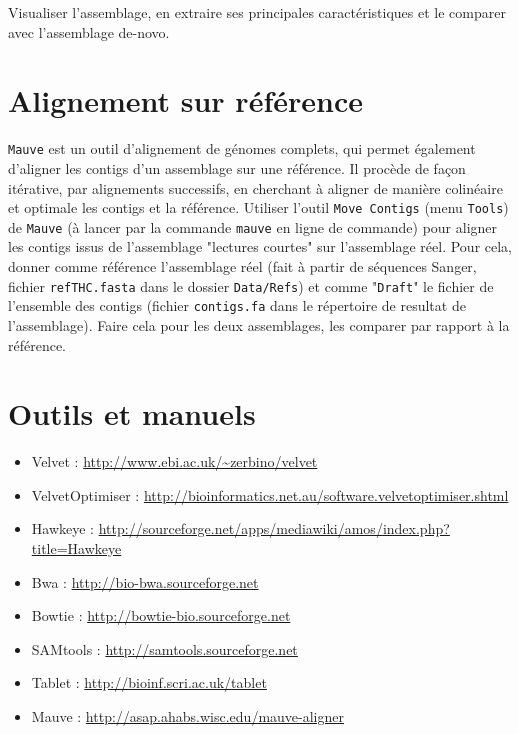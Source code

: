 \documentclass[a4paper,12pt]{article}
\begin{document}
Visualiser l'assemblage, en extraire ses principales caractéristiques  et le comparer avec l'assemblage de-novo.

\section{Alignement sur référence}
\verb=Mauve= est un outil d'alignement de génomes complets, qui permet également d'aligner les contigs d'un assemblage sur une référence. Il procède de façon itérative, par alignements successifs, en cherchant à aligner de manière colinéaire et optimale les contigs et la référence.
Utiliser l'outil \verb=Move Contigs= (menu \verb=Tools=) de \verb=Mauve= (à lancer par la commande \verb=mauve= en ligne de commande) pour aligner les contigs issus de l'assemblage "lectures courtes" sur l'assemblage réel. Pour cela, donner comme référence l'assemblage réel (fait à partir de séquences Sanger, fichier \verb=refTHC.fasta= dans le dossier \verb=Data/Refs=) et comme "\verb=Draft=" le fichier de l'ensemble des contigs (fichier \verb=contigs.fa= dans le répertoire de resultat de l'assemblage). Faire cela pour les deux assemblages, les comparer par rapport à la référence. 

\section{Outils et manuels}

\begin{itemize}
	\item Velvet : \url{http://www.ebi.ac.uk/~zerbino/velvet}
	\item VelvetOptimiser : \url{http://bioinformatics.net.au/software.velvetoptimiser.shtml}
	\item Hawkeye : \url{http://sourceforge.net/apps/mediawiki/amos/index.php?title=Hawkeye}
	\item Bwa : \url{http://bio-bwa.sourceforge.net}
	\item Bowtie : \url{http://bowtie-bio.sourceforge.net}
	\item SAMtools : \url{http://samtools.sourceforge.net}
	\item Tablet : \url{http://bioinf.scri.ac.uk/tablet}
	\item Mauve : \url{http://asap.ahabs.wisc.edu/mauve-aligner}
	
\end{itemize}

{}

\end{document}
